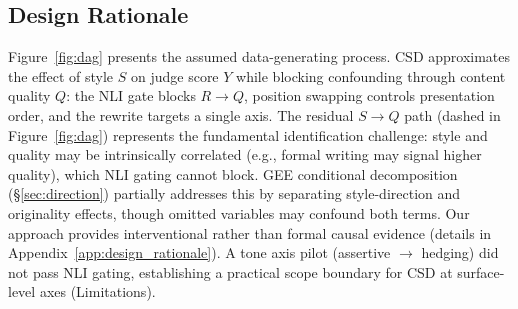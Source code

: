 \subsection{Design Rationale}
\label{sec:causal_framework}

Figure~\ref{fig:dag} presents the assumed data-generating process.
CSD approximates the effect of style $S$ on judge score $Y$ while blocking confounding through content quality $Q$: the NLI gate blocks $R \to Q$, position swapping controls presentation order, and the rewrite targets a single axis.
The residual $S \to Q$ path (dashed in Figure~\ref{fig:dag}) represents the fundamental identification challenge: style and quality may be intrinsically correlated (e.g., formal writing may signal higher quality), which NLI gating cannot block.
GEE conditional decomposition (\S\ref{sec:direction}) partially addresses this by separating style-direction and originality effects, though omitted variables may confound both terms.
Our approach provides interventional rather than formal causal evidence (details in Appendix~\ref{app:design_rationale}).
A tone axis pilot (assertive $\to$ hedging) did not pass NLI gating, establishing a practical scope boundary for CSD at surface-level axes (Limitations).
